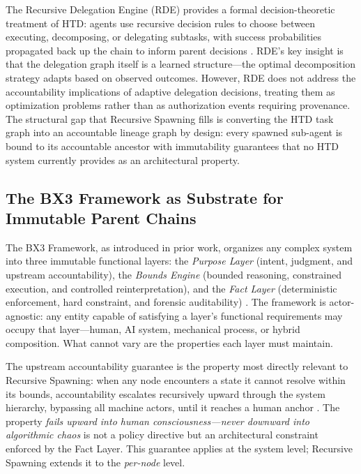 The Recursive Delegation Engine (RDE) provides a formal decision-theoretic treatment of HTD: agents use recursive decision rules to choose between executing, decomposing, or delegating subtasks, with success probabilities propagated back up the chain to inform parent decisions \cite{rde2025}. RDE's key insight is that the delegation graph itself is a learned structure---the optimal decomposition strategy adapts based on observed outcomes. However, RDE does not address the accountability implications of adaptive delegation decisions, treating them as optimization problems rather than as authorization events requiring provenance. The structural gap that Recursive Spawning fills is converting the HTD task graph into an accountable lineage graph by design: every spawned sub-agent is bound to its accountable ancestor with immutability guarantees that no HTD system currently provides as an architectural property.

\subsection{The BX3 Framework as Substrate for Immutable Parent Chains}

The BX3 Framework, as introduced in prior work, organizes any complex system into three immutable functional layers: the \textit{Purpose Layer} (intent, judgment, and upstream accountability), the \textit{Bounds Engine} (bounded reasoning, constrained execution, and controlled reinterpretation), and the \textit{Fact Layer} (deterministic enforcement, hard constraint, and forensic auditability) \cite{bx3framework}. The framework is actor-agnostic: any entity capable of satisfying a layer's functional requirements may occupy that layer---human, AI system, mechanical process, or hybrid composition. What cannot vary are the properties each layer must maintain.

The upstream accountability guarantee is the property most directly relevant to Recursive Spawning: when any node encounters a state it cannot resolve within its bounds, accountability escalates recursively upward through the system hierarchy, bypassing all machine actors, until it reaches a human anchor \cite{bx3framework}. The property \textit{fails upward into human consciousness---never downward into algorithmic chaos} is not a policy directive but an architectural constraint enforced by the Fact Layer. This guarantee applies at the system level; Recursive Spawning extends it to the \textit{per-node} level.


